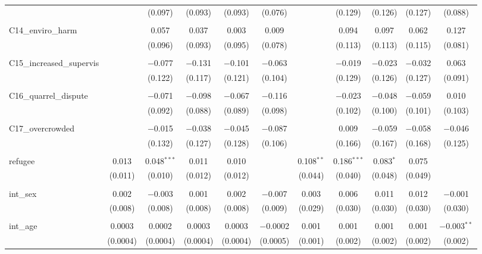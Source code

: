\begin{table}[H]
\begin{tabular}{@{\extracolsep{4pt}}lcccccccccc}
  &  & (0.097) & (0.093) & (0.093) & (0.076) &  & (0.129) & (0.126) & (0.127) & (0.088) \\ 
  & & & & & & & & & & \\ 
 C14\_enviro\_harm &  & 0.057 & 0.037 & 0.003 & 0.009 &  & 0.094 & 0.097 & 0.062 & 0.127 \\ 
  &  & (0.096) & (0.093) & (0.095) & (0.078) &  & (0.113) & (0.113) & (0.115) & (0.081) \\ 
  & & & & & & & & & & \\ 
 C15\_increased\_supervis &  & $-$0.077 & $-$0.131 & $-$0.101 & $-$0.063 &  & $-$0.019 & $-$0.023 & $-$0.032 & 0.063 \\ 
  &  & (0.122) & (0.117) & (0.121) & (0.104) &  & (0.129) & (0.126) & (0.127) & (0.091) \\ 
  & & & & & & & & & & \\ 
 C16\_quarrel\_dispute &  & $-$0.071 & $-$0.098 & $-$0.067 & $-$0.116 &  & $-$0.023 & $-$0.048 & $-$0.059 & 0.010 \\ 
  &  & (0.092) & (0.088) & (0.089) & (0.098) &  & (0.102) & (0.100) & (0.101) & (0.103) \\ 
  & & & & & & & & & & \\ 
 C17\_overcrowded &  & $-$0.015 & $-$0.038 & $-$0.045 & $-$0.087 &  & 0.009 & $-$0.059 & $-$0.058 & $-$0.046 \\ 
  &  & (0.132) & (0.127) & (0.128) & (0.106) &  & (0.166) & (0.167) & (0.168) & (0.125) \\ 
  & & & & & & & & & & \\ 
 refugee & 0.013 & 0.048$^{***}$ & 0.011 & 0.010 &  & 0.108$^{**}$ & 0.186$^{***}$ & 0.083$^{*}$ & 0.075 &  \\ 
  & (0.011) & (0.010) & (0.012) & (0.012) &  & (0.044) & (0.040) & (0.048) & (0.049) &  \\ 
  & & & & & & & & & & \\ 
 int\_sex & 0.002 & $-$0.003 & 0.001 & 0.002 & $-$0.007 & 0.003 & 0.006 & 0.011 & 0.012 & $-$0.001 \\ 
  & (0.008) & (0.008) & (0.008) & (0.008) & (0.009) & (0.029) & (0.030) & (0.030) & (0.030) & (0.030) \\ 
  & & & & & & & & & & \\ 
 int\_age & 0.0003 & 0.0002 & 0.0003 & 0.0003 & $-$0.0002 & 0.001 & 0.001 & 0.001 & 0.001 & $-$0.003$^{**}$ \\ 
  & (0.0004) & (0.0004) & (0.0004) & (0.0004) & (0.0005) & (0.001) & (0.002) & (0.002) & (0.002) & (0.002) \\ 

\end{tabular}
\end{table}
